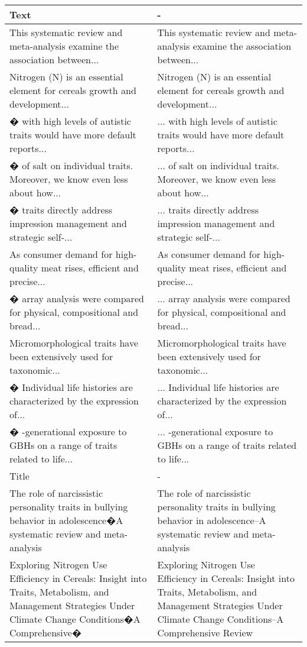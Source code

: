 \begin{table}[ptb]
\begin{tabular}{ | m{7.5cm} | m{7.5cm}| }
        \hline
        \rowcolor{lightgray}
        Text & - \\ 
        \hline
        This systematic review and meta-analysis examine the association between... & This systematic review and meta-analysis examine the association between... \\ 
        Nitrogen (N) is an essential element for cereals growth and development... & Nitrogen (N) is an essential element for cereals growth and development... \\
        � with high levels of autistic traits would have more default reports... & ... with high levels of autistic traits would have more default reports... \\
        � of salt on individual traits. Moreover, we know even less about how... & ... of salt on individual traits. Moreover, we know even less about how... \\
        � traits directly address impression management and strategic self-... & ... traits directly address impression management and strategic self-... \\
        As consumer demand for high-quality meat rises, efficient and precise... & As consumer demand for high-quality meat rises, efficient and precise... \\
        � array analysis were compared for physical, compositional and bread... & ... array analysis were compared for physical, compositional and bread... \\
        Micromorphological traits have been extensively used for taxonomic... & Micromorphological traits have been extensively used for taxonomic... \\
        � Individual life histories are characterized by the expression of... & ... Individual life histories are characterized by the expression of... \\
        � -generational exposure to GBHs on a range of traits related to life... & ... -generational exposure to GBHs on a range of traits related to life... \\
        \hline
        \rowcolor{lightgray}
        Title & - \\ 
        \hline
        The role of narcissistic personality traits in bullying behavior in adolescence�A systematic review and meta-analysis & The role of narcissistic personality traits in bullying behavior in adolescence–A systematic review and meta-analysis \\ 
        Exploring Nitrogen Use Efficiency in Cereals: Insight into Traits, Metabolism, and Management Strategies Under Climate Change Conditions�A Comprehensive� & Exploring Nitrogen Use Efficiency in Cereals: Insight into Traits, Metabolism, and Management Strategies Under Climate Change Conditions–A Comprehensive Review \\

\end{tabular}
\end{table}
